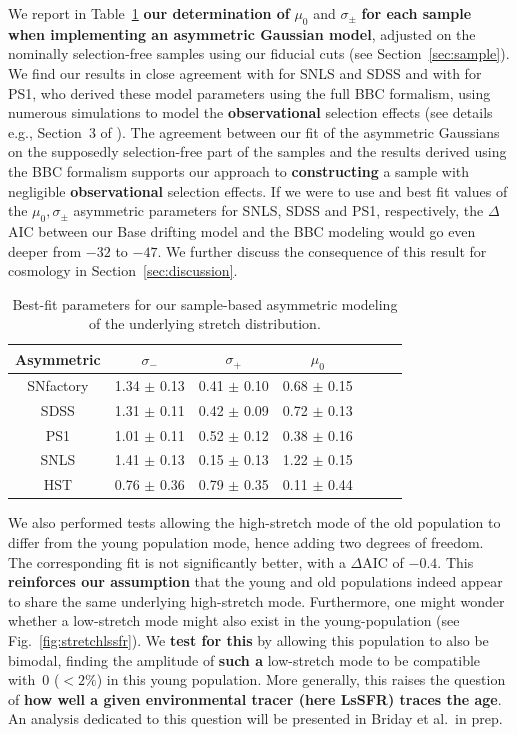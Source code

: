 \documentclass[referee]{aa}
\begin{document}
We report in Table~\ref{tab:bbc} \textbf{our determination of} $\mu_0$ and
$\sigma_{\pm}$ \textbf{for each sample when implementing an asymmetric Gaussian
model}, adjusted on the nominally selection-free samples using our fiducial cuts
(see Section~\ref{sec:sample}). We find our results in close agreement with
\cite{scolnic2016} for SNLS and SDSS and with \cite{scolnic2018a} for PS1, who
derived these model parameters using the full BBC formalism, using numerous
simulations to model the \textbf{observational} selection effects (see details
e.g., Section~3 of \citealt{kessler2017}). The agreement between our fit of the
asymmetric Gaussians on the supposedly selection-free part of the samples and
the results derived using the BBC formalism supports our approach to
\textbf{constructing} a sample with negligible \textbf{observational} selection
effects. If we were to use \cite{scolnic2016} and \cite{scolnic2018a} best fit
values of the $\mu_0, \sigma_{\pm}$ asymmetric parameters for SNLS, SDSS and
PS1, respectively, the $\Delta$AIC between our Base drifting model and the BBC
modeling would go even deeper from $-32$ to $-47$. We further discuss the
consequence of this result for cosmology in Section~\ref{sec:discussion}.
    
\begin{table}
    \centering
    \caption{Best-fit parameters for our sample-based asymmetric modeling of the
    underlying stretch distribution.}
    \label{tab:bbc}
    \begin{tabular}{ccccccc}
    \hline\hline
    Asymmetric & $\sigma_{-}$ & $\sigma_{+}$ & $\mu_0$ \\
    \hline
    SNfactory & 1.34 $\pm$ 0.13 & 0.41 $\pm$ 0.10 & 0.68 $\pm$ 0.15 \\
    SDSS & 1.31 $\pm$ 0.11 & 0.42 $\pm$ 0.09 & 0.72 $\pm$ 0.13 \\
    PS1 & 1.01 $\pm$ 0.11 & 0.52 $\pm$ 0.12 & 0.38 $\pm$ 0.16 \\
    SNLS & 1.41 $\pm$ 0.13 & 0.15 $\pm$ 0.13 & 1.22 $\pm$ 0.15 \\
    HST & 0.76 $\pm$ 0.36 & 0.79 $\pm$ 0.35 & 0.11 $\pm$ 0.44 \\
    \hline
    \end{tabular}
\end{table}
    
We also performed tests allowing the high-stretch mode of the old population to
differ from the young population mode, hence adding two degrees of freedom. The
corresponding fit is not significantly better, with a $\Delta$AIC of $-0.4$.
This \textbf{reinforces our assumption} that the young and old populations
indeed appear to share the same underlying high-stretch mode. Furthermore, one
might wonder whether a low-stretch mode might also exist in the young-population
(see Fig.~\ref{fig:stretchlssfr}). We \textbf{test for this} by allowing this
population to also be bimodal, finding the amplitude of \textbf{such a}
low-stretch mode to be compatible with~0 ($<2\%$) in this young population. More
generally, this raises the question of \textbf{how well a given environmental
tracer (here LsSFR) traces the age}. An analysis dedicated to this question will
be presented in Briday et al.\ in prep.
\end{document}
